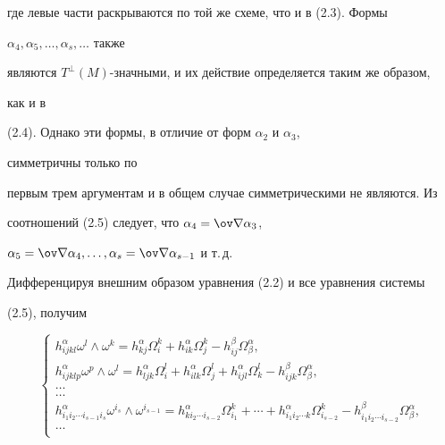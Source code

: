 где левые части раскрываются по той же схеме, что и в (2.3). Формы 


$\alpha_4,\alpha_5,\dotsc,\alpha_s,\dotsc$ также 


являются $T^\bot(M)$-значными, и их действие определяется таким же образом, 


как и в 


(2.4). Однако эти формы, в отличие от форм $\alpha_2$ и $\alpha_3$, 


симметричны только по 


первым трем аргументам и в общем случае симметрическими не являются. Из 


соотношений (2.5) следует, что $\alpha_4=\ov\na\alpha_3$, 


$\alpha_5=\ov\na\alpha_4,\dotsc,\alpha_s=\ov\na\alpha_{s-1}$ и т.\,д. 


 


Дифференцируя внешним образом уравнения (2.2) и все уравнения системы 


(2.5), получим 


\begin{equation} 


\left\{ 


\begin{array}{l} 


h^\alpha_{ijkl}\omega^l\wedge\omega^k=h^\alpha_{kj}\Omega^k_i 


+h^\alpha_{ik}\Omega^k_j-h^\beta_{ij}\Omega^\alpha_\beta,\\ 


h^\alpha_{ijklp}\omega^p\wedge\omega^l=h^\alpha_{ljk}\Omega^l_i 


+h^\alpha_{ilk}\Omega^l_j+h^\alpha_{ijl}\Omega^l_k- 


h^\beta_{ijk}\Omega^\alpha_\beta,\\ 


\dots\\


\dots\\


h^\alpha_{i_1i_2\dotsb i_{s-1}i_s}\omega^{i_s}\wedge\omega^{i_{s-1}}= 


h^\alpha_{ki_2\dotsb i_{s-2}}\Omega^k_{i_1}+\dotsb+ 


h^\alpha_{i_1i_2\dotsb k}\Omega^k_{i_{s-2}}- 


h^\beta_{i_1i_2\dotsb i_{s-2}}\Omega^\alpha_\beta,\\ 


\dots\\


\end{array} 


\right. 


\end{equation} 


